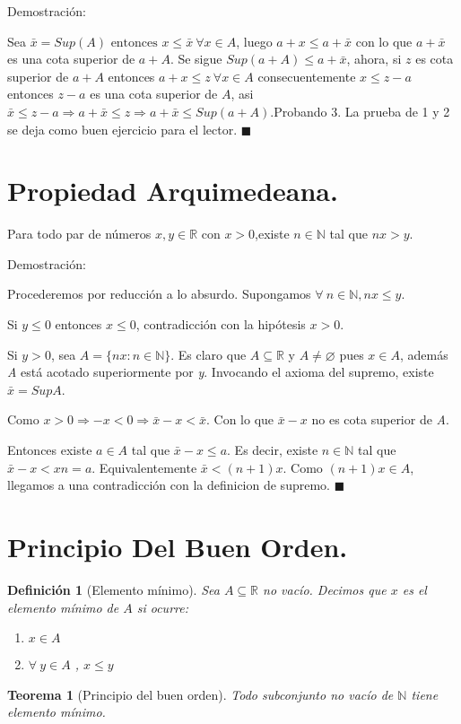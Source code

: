 \documentclass[12pt]{book}
\newcommand\R{{\mathbb R}}
\newcommand\N{{\mathbb N}}
\newtheorem{teo}{Teorema}[section]
\newtheorem{defi}{Definición}[section]
\begin{document}
Demostración:

Sea $\bar{x}=Sup(A) \mbox{ entonces } x \le \bar{x} \  \forall{x\in A}$, luego $a+x \le a+\bar{x}$ con lo que $a+\bar{x}$ es una cota superior de $a+A$. Se sigue $Sup(a+A) \le a+\bar{x}$, ahora, si $z$ es cota superior de $a+A$ entonces $a+x \le z \ \forall{x \in A}$ consecuentemente $x \le z-a$ entonces $z-a$ es una cota superior de $A$, asi $\bar{x} \le z-a \Rightarrow a+\bar{x} \le z \Rightarrow a+\bar{x} \le Sup(a+A)$.Probando 3. La prueba de 1 y 2 se deja como buen ejercicio para el lector. $\blacksquare$

\section{Propiedad Arquimedeana.}

Para todo par de números $x,y\in \R$ con $x> 0$,existe $n\in\N$ tal que $nx> y$.

Demostración:

Procederemos por reducción a lo absurdo. Supongamos $\forall \ n\in\mathbb{N},nx\le{y}$.

Si $y\le{0}$ entonces $x\le{0}$, contradicción con la hipótesis $x>0$.

Si $y>0$, sea $A=\lbrace nx:n\in{\mathbb{N}}\rbrace$.
Es claro que $A\subseteq{\R}$ y $ A\neq \varnothing$ pues $x\in A$, además \textit{A} está acotado superiormente por \textit{y}.
Invocando el axioma del supremo, existe $\bar{x}=SupA$.

Como $x>0 \Rightarrow -x<0\Rightarrow \bar{x}-x<\bar{x}$.
Con lo que $\bar{x}-x$ no es cota superior de \textit{A}.

Entonces existe $a \in A$ tal que $\bar{x}-x \le a$.
Es decir, existe $n\in\N$ tal que $\bar{x}-x<xn=a$. Equivalentemente $\bar{x}<(n+1)x$.
Como $(n+1)x\in{A}$, llegamos a una contradicción con la definicion de supremo. $\blacksquare$

\section{Principio Del Buen Orden.}

\begin{defi}[Elemento mínimo]\rm
Sea $A\subseteq\R$ no vacío. Decimos que $x$ es el elemento mínimo de $A$ si ocurre:
\begin{enumerate}[1.]
\item $x\in{A}$
\item $\forall \ y\in{A}$ , $x\le{y}$
\end{enumerate}
\end{defi}
\begin{teo}[Principio del buen orden]\rm
Todo subconjunto no vacío de $\N$ tiene elemento mínimo.
\end{teo}
\end{document}
